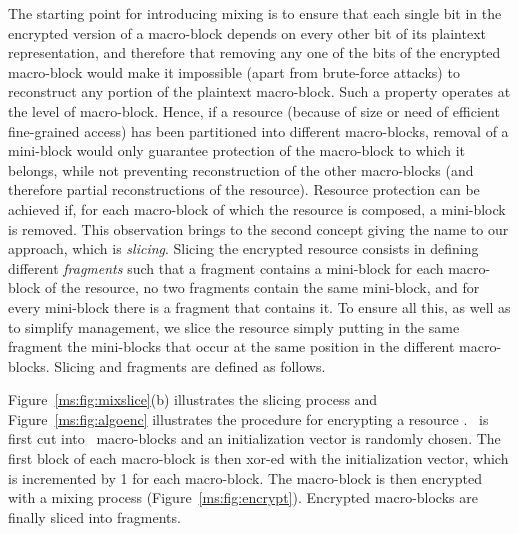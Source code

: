 The starting point for introducing mixing is to ensure that each single bit in the encrypted version of a macro-block depends on every other bit of its plaintext representation, and therefore that removing any one of the bits of the encrypted macro-block would make it impossible (apart from brute-force attacks) to reconstruct any portion of the plaintext macro-block. Such a property operates at the level of macro-block. Hence, if a resource (because of size or need of efficient fine-grained access) has been partitioned into different macro-blocks, removal of a mini-block would only guarantee protection of the macro-block to which it belongs, while not preventing reconstruction of the other macro-blocks (and therefore partial reconstructions of the resource). Resource protection can be achieved if, for each macro-block of which the resource is composed, a mini-block is removed. This observation brings to the second concept giving the name to our approach, which is {\em slicing}. Slicing the encrypted resource consists in defining different {\em fragments} such that a fragment contains a mini-block for each macro-block of the resource, no two fragments contain the same mini-block, and for every mini-block there is a fragment that contains it. To ensure all this, as well as to simplify management, we slice the resource simply putting in the same fragment the mini-blocks that occur at the same position in the different macro-blocks. Slicing and fragments are defined as follows.

\begin{dfn}
\end{dfn}

Figure~\ref{ms:fig:mixslice}(b) illustrates the slicing process and Figure~\ref{ms:fig:algoenc} illustrates the procedure for encrypting a resource \resource. \resource\ is first cut into \Mnum\ macro-blocks and an initialization vector is randomly chosen. The first block of each macro-block is then {\sc xor}-ed with the initialization vector, which is incremented by 1 for each macro-block. The macro-block is then encrypted with a mixing process (Figure~\ref{ms:fig:encrypt}). Encrypted macro-blocks are finally sliced into fragments.
